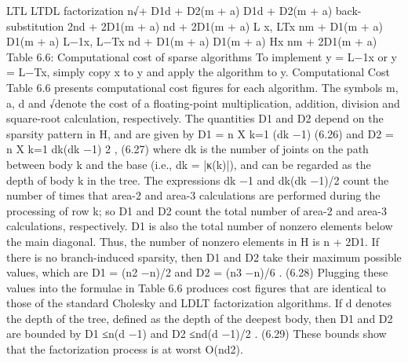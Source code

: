 LTL LTDL factorization n√+ D1d + D2(m + a) D1d + D2(m + a) back-substitution 2nd + 2D1(m + a) nd + 2D1(m + a) L x, LTx nm + D1(m + a) D1(m + a) L−1x, L−Tx nd + D1(m + a) D1(m + a) Hx nm + 2D1(m + a) Table 6.6: Computational cost of sparse algorithms To implement y = L−1x or y = L−Tx, simply copy x to y and apply the algorithm to y. Computational Cost Table 6.6 presents computational cost figures for each algorithm. The symbols m, a, d and √denote the cost of a floating-point multiplication, addition, division and square-root calculation, respectively. The quantities D1 and D2 depend on the sparsity pattern in H, and are given by D1 = n X k=1 (dk −1) (6.26) and D2 = n X k=1 dk(dk −1) 2 , (6.27) where dk is the number of joints on the path between body k and the base (i.e., dk = |κ(k)|), and can be regarded as the depth of body k in the tree. The expressions dk −1 and dk(dk −1)/2 count the number of times that area-2 and area-3 calculations are performed during the processing of row k; so D1 and D2 count the total number of area-2 and area-3 calculations, respectively. D1 is also the total number of nonzero elements below the main diagonal. Thus, the number of nonzero elements in H is n + 2D1. If there is no branch-induced sparsity, then D1 and D2 take their maximum possible values, which are D1 = (n2 −n)/2 and D2 = (n3 −n)/6 . (6.28) Plugging these values into the formulae in Table 6.6 produces cost figures that are identical to those of the standard Cholesky and LDLT factorization algorithms. If d denotes the depth of the tree, defined as the depth of the deepest body, then D1 and D2 are bounded by D1 ≤n(d −1) and D2 ≤nd(d −1)/2 . (6.29) These bounds show that the factorization process is at worst O(nd2).

